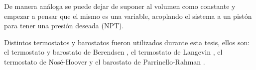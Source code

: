 De manera análoga se puede dejar de suponer al volumen como constante y empezar a
pensar que el mismo es una variable, acoplando el sistema a un pistón para tener
una presión deseada (NPT).

Distintos termostatos y barostatos fueron utilizados durante esta tesis, ellos 
son: el termostato y barostato de Berendsen \cite{berendsen1984}, el termostato 
de Langevin \cite{schneider1978, kroger2005}, el termostato de Nosé-Hoover 
\cite{nose1984a, nose1984b, hoover1985} y el barostato de Parrinello-Rahman
\cite{parrinello-rahman}.
